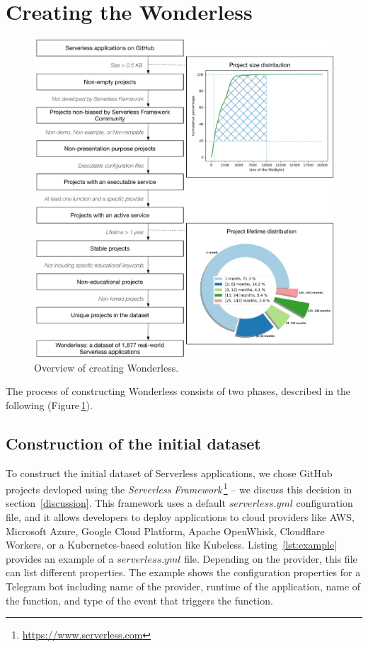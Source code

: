 
\section{Creating the Wonderless}
\label{dataset}

\begin{figure}
	\centering
	\includegraphics[scale=0.3]{figures/processOverviewFinalgraffle}
	\caption{Overview of creating Wonderless.}
	\label{fig:overview}
\end{figure}



The  process of constructing Wonderless
consists of two phases, described in the following (Figure\,\ref{fig:overview}).

\subsection{Construction of the initial dataset} \label{phaseA}

To construct the initial dataset of Serverless applications, we chose GitHub projects 
devloped using the \emph{Serverless Framework}\,\footnote{\url{https://www.serverless.com}} 
-- we discuss this decision in section~\ref{discussion}.
This framework uses a default $serverless.yml$ configuration file, 
and it allows developers to deploy 
applications to cloud providers like AWS, Microsoft Azure, Google Cloud 
Platform, Apache OpenWhisk, Cloudflare Workers, or a Kubernetes-based 
solution like Kubeless.
%
Listing~\ref{lst:example} provides an example of a $serverless.yml$ file. 
Depending on the provider, this file can list different properties.
The example shows the configuration properties for a Telegram bot including 
name of the provider, runtime of the application, name of the function, 
and type of the event that triggers the function. 

